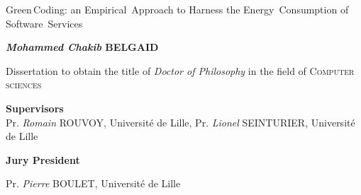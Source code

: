 \begin{center}
    \LARGE
    Green\,Coding: an Empirical~Approach to Harness the Energy~Consumption of Software~Services

    \vspace{.8cm}
    \Large
    \textbf{\emph{Mohammed Chakib} \textsc{BELGAID}}
    \vspace{0.8cm}
    \large

    Dissertation to obtain the title of \emph{Doctor of Philosophy} in the field of \textsc{Computer sciences}\\
    \vspace{0.8cm}

    \large
    \textbf{Supervisors}\\
    \RaggedRight
    \vspace{.5cm}
    \normalsize
    Pr. \emph{Romain} \textsc{ROUVOY}, Université de Lille,\newline
    Pr. \emph{Lionel} \textsc{SEINTURIER}, Université de Lille
    \endminipage
    \vspace{0.6cm}

    \large
    \textbf{Jury President}\\
    \normalsize

    \vspace{.5cm}

    Pr. \emph{Pierre} \textsc{BOULET}, Université de Lille
    \endminipage
    \vspace{.5cm}
    \\


\end{center}
